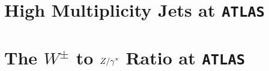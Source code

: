 \chapter{High Multiplicity Jets at \texttt{ATLAS}}
\label{chap:ATLAS}

\chapter{The $W^\pm$ to ${Z/\gamma^*}$ Ratio at \texttt{ATLAS}}
\label{chap:ATLAS}

